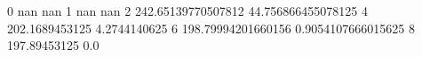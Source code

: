 0 nan nan
1 nan nan
2 242.65139770507812 44.756866455078125
4 202.1689453125 4.2744140625
6 198.79994201660156 0.9054107666015625
8 197.89453125 0.0
